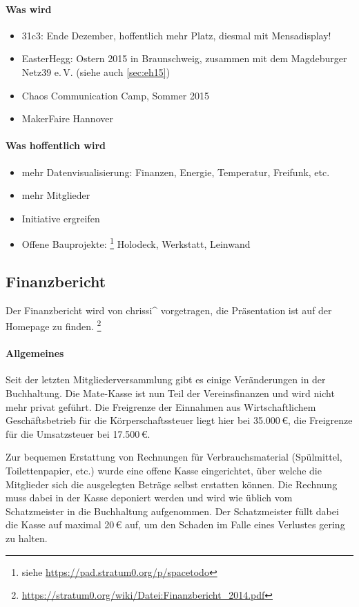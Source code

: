 \documentclass[a4paper,12pt]{scrartcl}
\begin{document}
\paragraph{Was wird}
\begin{itemize}
  \item 31c3: Ende Dezember, hoffentlich mehr Platz, diesmal mit Mensadisplay!
  \item EasterHegg: Ostern 2015 in Braunschweig, zusammen mit dem Magdeburger
    Netz39 e.\,V. (siehe auch \ref{sec:eh15})
  \item Chaos Communication Camp, Sommer 2015
  \item MakerFaire Hannover
\end{itemize}

\paragraph{Was hoffentlich wird}
\begin{itemize}
  \item mehr Datenvisualisierung: Finanzen, Energie, Temperatur, Freifunk, etc.
  \item mehr Mitglieder
  \item Initiative ergreifen
  \item Offene Bauprojekte: \footnote{siehe
    \url{https://pad.stratum0.org/p/spacetodo}} Holodeck, Werkstatt, Leinwand
\end{itemize}

\subsection*{Finanzbericht}
Der Finanzbericht wird von chrissi\textasciicircum{}
vorgetragen, die Präsentation ist auf der Homepage zu finden.
\footnote{\url{https://stratum0.org/wiki/Datei:Finanzbericht_2014.pdf}}

\paragraph{Allgemeines}
Seit der letzten Mitgliederversammlung gibt es einige Veränderungen in der
Buchhaltung. Die Mate-Kasse ist nun Teil der Vereinsfinanzen und wird nicht mehr
privat geführt. Die Freigrenze der Einnahmen aus Wirtschaftlichem
Geschäftsbetrieb für die Körperschaftssteuer liegt hier bei 35{.}000\,€, die
Freigrenze für die Umsatzsteuer bei 17{.}500\,€.

Zur bequemen Erstattung von Rechnungen für Verbrauchsmaterial (Spülmittel,
Toilettenpapier, etc.) wurde eine offene Kasse eingerichtet, über welche
die Mitglieder sich die ausgelegten Beträge selbst erstatten können. Die
Rechnung muss dabei in der Kasse deponiert werden und wird wie üblich vom
Schatzmeister in die Buchhaltung aufgenommen. Der Schatzmeister füllt dabei die
Kasse auf maximal 20\,€ auf, um den Schaden im Falle eines Verlustes gering zu
halten.
\end{document}
